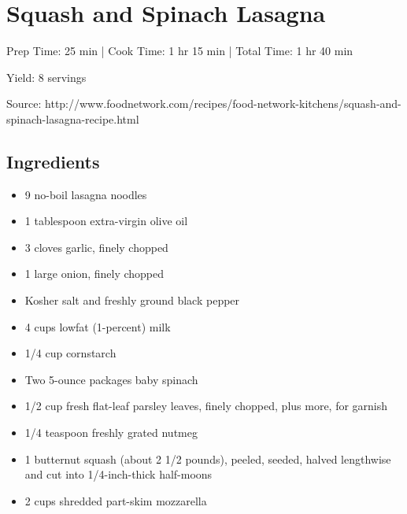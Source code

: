 \section{Squash and Spinach Lasagna}

\begin{center}
Prep Time: 25 min |
Cook Time: 1 hr 15 min |
Total Time: 1 hr 40 min

\noindent Yield: 8 servings

\vspace{1em}

Source: http://www.foodnetwork.com/recipes/food-network-kitchens/squash-and-spinach-lasagna-recipe.html
\end{center}

\subsection{Ingredients}
\begin{multicols}{2}
\begin{itemize}
    \item 9 no-boil lasagna noodles
    \item 1 tablespoon extra-virgin olive oil
    \item 3 cloves garlic, finely chopped
    \item 1 large onion, finely chopped
    \item Kosher salt and freshly ground black pepper
    \item 4 cups lowfat (1-percent) milk
    \item 1/4 cup cornstarch
    \item Two 5-ounce packages baby spinach
    \item 1/2 cup fresh flat-leaf parsley leaves, finely chopped, plus more, for garnish
    \item 1/4 teaspoon freshly grated nutmeg
    \item 1 butternut squash (about 2 1/2 pounds), peeled, seeded, halved lengthwise and cut into 1/4-inch-thick half-moons
    \item 2 cups shredded part-skim mozzarella
\end{itemize}
\end{multicols}

